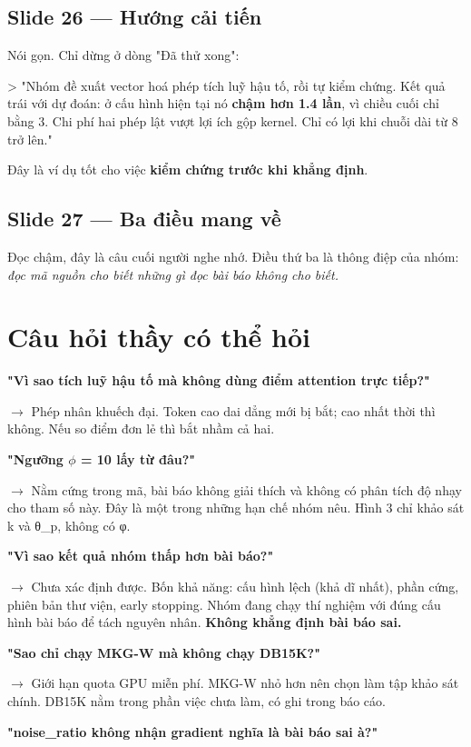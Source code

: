 \documentclass[11pt,a4paper]{article}
\newcommand{\code}[1]{{\ttfamily\small\color{codetext}#1}}
\begin{document}
\subsection{Slide 26 --- Hướng cải tiến}
Nói gọn. Chỉ dừng ở dòng "Đã thử xong":

> "Nhóm đề xuất vector hoá phép tích luỹ hậu tố, rồi tự kiểm chứng. Kết quả trái với dự đoán: ở cấu hình hiện tại nó \textbf{chậm hơn 1.4 lần}, vì chiều cuối chỉ bằng 3. Chi phí hai phép lật vượt lợi ích gộp kernel. Chỉ có lợi khi chuỗi dài từ 8 trở lên."

Đây là ví dụ tốt cho việc \textbf{kiểm chứng trước khi khẳng định}.

\subsection{Slide 27 --- Ba điều mang về}
Đọc chậm, đây là câu cuối người nghe nhớ. Điều thứ ba là thông điệp của nhóm: \emph{đọc mã nguồn cho biết những gì đọc bài báo không cho biết.}

\section{Câu hỏi thầy có thể hỏi}
\textbf{"Vì sao tích luỹ hậu tố mà không dùng điểm attention trực tiếp?"}

$\rightarrow$ Phép nhân khuếch đại. Token cao dai dẳng mới bị bắt; cao nhất thời thì không. Nếu so điểm đơn lẻ thì bắt nhầm cả hai.

\textbf{"Ngưỡng $\phi$ = 10 lấy từ đâu?"}

$\rightarrow$ Nằm cứng trong mã, bài báo không giải thích và không có phân tích độ nhạy cho tham số này. Đây là một trong những hạn chế nhóm nêu. Hình 3 chỉ khảo sát \code{k} và \code{θ\_p}, không có \code{φ}.

\textbf{"Vì sao kết quả nhóm thấp hơn bài báo?"}

$\rightarrow$ Chưa xác định được. Bốn khả năng: cấu hình lệch (khả dĩ nhất), phần cứng, phiên bản thư viện, early stopping. Nhóm đang chạy thí nghiệm với đúng cấu hình bài báo để tách nguyên nhân. \textbf{Không khẳng định bài báo sai.}

\textbf{"Sao chỉ chạy MKG-W mà không chạy DB15K?"}

$\rightarrow$ Giới hạn quota GPU miễn phí. MKG-W nhỏ hơn nên chọn làm tập khảo sát chính. DB15K nằm trong phần việc chưa làm, có ghi trong báo cáo.

\textbf{"noise\_ratio không nhận gradient nghĩa là bài báo sai à?"}
\end{document}
